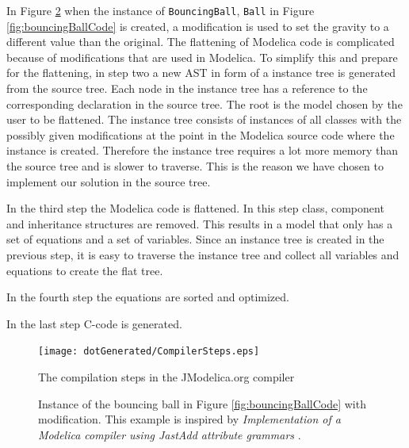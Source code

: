 \documentclass{cslthse-msc}
\begin{document}
In Figure \ref{fig:bouncingBallInstance} when the instance of \texttt{BouncingBall}, \texttt{Ball} in Figure \ref{fig:bouncingBallCode} is created, a modification is used to set the gravity to a different value than the original. The flattening of Modelica code is complicated because of modifications that are used in Modelica. To simplify this and  prepare for the flattening, in step two a new AST in form of a instance tree is generated from the source tree. Each node in the instance tree has a reference to the corresponding declaration in the source tree. The root is the model chosen by the user to be flattened. The instance tree consists of instances of all classes with the possibly given modifications at the point in the Modelica source code where the instance is created. Therefore the instance tree requires a lot more memory than the source tree and is slower to traverse. This is the reason we have chosen to implement our solution in the source tree. 

In the third step the Modelica code is flattened. In this step class, component and inheritance structures are removed. This results in a model that only has a set of equations and a set of variables. Since an instance tree is created in the previous step, it is easy to traverse the instance tree and collect all variables and equations to create the flat tree.

In the fourth step the equations are sorted and optimized.

In the last step C-code is generated.

\begin{figure}[!htbp]
    \centering
    {\texttt{[image: dotGenerated/CompilerSteps.eps]}}
    \caption{The compilation steps in the JModelica.org compiler}
    \label{fig:compilerSteps}
\end{figure}

\begin{figure}[!htbp]
    \centering
    
    \caption{Instance of the bouncing ball in Figure \ref{fig:bouncingBallCode} with modification. This example is inspired by \textit{Implementation of a Modelica compiler using JastAdd attribute grammars} \cite{aakesson2010implementation}.}
    \label{fig:bouncingBallInstance}
\end{figure}
\end{document}
